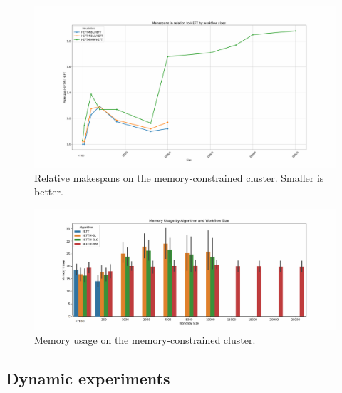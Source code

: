 \documentclass[conference]{IEEEtran}
\begin{document}
    \begin{figure}[tb]
        \centering
        \includegraphics[width=1\columnwidth] {images/makespan_relations_by_wf_size-constrained}
        \caption{Relative makespans on the memory-constrained cluster.
        Smaller is better.}
        \label{fig:ms-relations-by-workflow-constrained}
        \vspace{-0.3cm}
    \end{figure}


    \begin{figure}[tb]
        \centering
        \includegraphics[width=1.1\columnwidth] {images/mem-usage-constrained-onlyvalid}
        \caption{Memory usage on the memory-constrained  cluster. } %
        \label{fig:memory-usage-constrained}
        \vspace{-0.3cm}
    \end{figure}


    
\subsection{Dynamic experiments}
\label{sec.expe.dyn}
\end{document}
